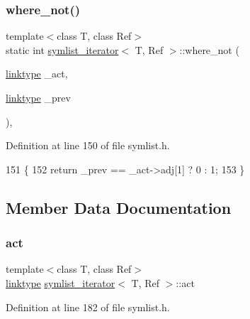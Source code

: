\subsubsection{\texorpdfstring{where\+\_\+not()}{where\_not()}}
{\footnotesize\ttfamily template$<$class T, class Ref$>$ \\
static int \mbox{\hyperlink{structsymlist__iterator}{symlist\+\_\+iterator}}$<$ T, Ref $>$\+::where\+\_\+not (\begin{DoxyParamCaption}\item[{\mbox{\hyperlink{structsymlist__iterator_ad9462ba519f8ca01ea64e04e25ee3750}{linktype}}}]{\+\_\+act,  }\item[{\mbox{\hyperlink{structsymlist__iterator_ad9462ba519f8ca01ea64e04e25ee3750}{linktype}}}]{\+\_\+prev }\end{DoxyParamCaption})\hspace{0.3cm}{\ttfamily [inline]}, {\ttfamily [static]}}



Definition at line 150 of file symlist.\+h.


\begin{DoxyCode}
151     \{
152     \textcolor{keywordflow}{return} \_prev == \_act->adj[1] ? 0 : 1;
153     \}
\end{DoxyCode}


\subsection{Member Data Documentation}
\mbox{\label{structsymlist__iterator_a1c7a0193ab85baa7705070975d841fc8}} 
\subsubsection{\texorpdfstring{act}{act}}
{\footnotesize\ttfamily template$<$class T, class Ref$>$ \\
\mbox{\hyperlink{structsymlist__iterator_ad9462ba519f8ca01ea64e04e25ee3750}{linktype}} \mbox{\hyperlink{structsymlist__iterator}{symlist\+\_\+iterator}}$<$ T, Ref $>$\+::act}



Definition at line 182 of file symlist.\+h.

\mbox{\label{structsymlist__iterator_a8433e558ceb6b17b225414ef46b4a3e2}} 
